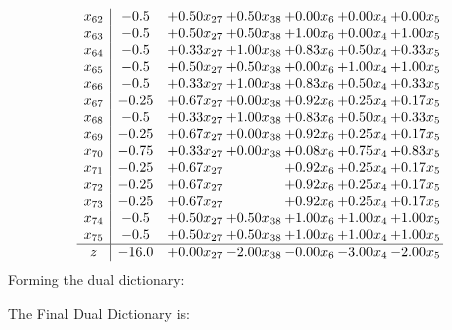 \documentclass[8pt]{article}
\begin{document}
\[\begin{array}{c| c c@{\hskip 2pt} c@{\hskip 2pt} c@{\hskip 2pt} c@{\hskip 2pt} c@{\hskip 2pt} }
 x_{62}   &  -0.5 & +  0.50 x_{27} & +  0.50 x_{38} & +  0.00 x_{6} & +  0.00 x_{4} & +  0.00 x_{5}\\
 x_{63}   &  -0.5 & +  0.50 x_{27} & +  0.50 x_{38} & +  1.00 x_{6} & +  0.00 x_{4} & +  1.00 x_{5}\\
 x_{64}   &  -0.5 & +  0.33 x_{27} & +  1.00 x_{38} & +  0.83 x_{6} & +  0.50 x_{4} & +  0.33 x_{5}\\
 x_{65}   &  -0.5 & +  0.50 x_{27} & +  0.50 x_{38} & +  0.00 x_{6} & +  1.00 x_{4} & +  1.00 x_{5}\\
 x_{66}   &  -0.5 & +  0.33 x_{27} & +  1.00 x_{38} & +  0.83 x_{6} & +  0.50 x_{4} & +  0.33 x_{5}\\
 x_{67}   &  -0.25 & +  0.67 x_{27} & +  0.00 x_{38} & +  0.92 x_{6} & +  0.25 x_{4} & +  0.17 x_{5}\\
 x_{68}   &  -0.5 & +  0.33 x_{27} & +  1.00 x_{38} & +  0.83 x_{6} & +  0.50 x_{4} & +  0.33 x_{5}\\
 x_{69}   &  -0.25 & +  0.67 x_{27} & +  0.00 x_{38} & +  0.92 x_{6} & +  0.25 x_{4} & +  0.17 x_{5}\\
 x_{70}   &  -0.75 & +  0.33 x_{27} & +  0.00 x_{38} & +  0.08 x_{6} & +  0.75 x_{4} & +  0.83 x_{5}\\
 x_{71}   &  -0.25 & +  0.67 x_{27} &   & +  0.92 x_{6} & +  0.25 x_{4} & +  0.17 x_{5}\\
 x_{72}   &  -0.25 & +  0.67 x_{27} &   & +  0.92 x_{6} & +  0.25 x_{4} & +  0.17 x_{5}\\
 x_{73}   &  -0.25 & +  0.67 x_{27} &   & +  0.92 x_{6} & +  0.25 x_{4} & +  0.17 x_{5}\\
 x_{74}   &  -0.5 & +  0.50 x_{27} & +  0.50 x_{38} & +  1.00 x_{6} & +  1.00 x_{4} & +  1.00 x_{5}\\
 x_{75}   &  -0.5 & +  0.50 x_{27} & +  0.50 x_{38} & +  1.00 x_{6} & +  1.00 x_{4} & +  1.00 x_{5}\\
\hline
z    &  -16.0 & +  0.00 x_{27} & -2.00 x_{38} & -0.00 x_{6} & -3.00 x_{4} & -2.00 x_{5}\\
\end{array}\]
Forming the dual dictionary:

The Final Dual Dictionary is: 
\end{document}
